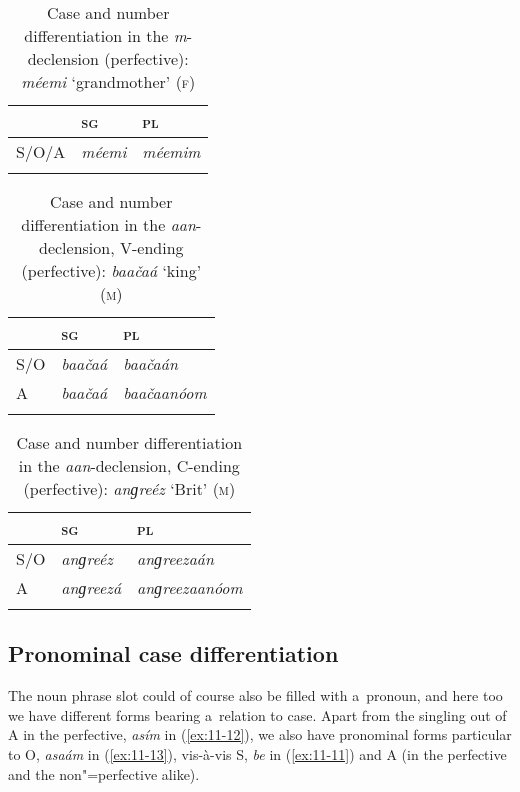 \begin{table}[ht]
\caption{Case and number differentiation in the \textit{m}-declension (perfective): \textit{méemi} `grandmother' \textsc{(f)}}
\begin{tabularx}{\textwidth}{ Q Q Q }
\lsptoprule
&
\textsc{sg} &
\textsc{pl}\\\hline
S/O/A &
\textit{méemi} &
\textit{méemim} \\\lspbottomrule
\end{tabularx}
\label{tab:11-mdecl}
\end{table}


\begin{table}[ht]
\caption{Case and number differentiation in the \textit{aan}-declension, V-ending (perfective): \textit{baačaá} `king' \textsc{(m)}}
\begin{tabularx}{\textwidth}{ Q Q Q }
\lsptoprule
&
\textsc{sg} &
\textsc{pl}\\\hline
S/O &
\textit{baačaá} &
\textit{baačaán} \\
A &
\textit{baačaá} &
\textit{baačaanóom} \\\lspbottomrule
\end{tabularx}
\label{tab:11-aanvdecl}
\end{table}

\begin{table}[ht]
\caption{Case and number differentiation in the \textit{aan}-declension, C-ending (perfective): \textit{anɡreéz} `Brit' \textsc{(m)}}
\begin{tabularx}{\textwidth}{ Q Q Q }
\lsptoprule
&
\textsc{sg} &
\textsc{pl}\\\hline
S/O &
\textit{anɡreéz} &
\textit{anɡreezaán} \\
A &
\textit{anɡreezá} &
\textit{anɡreezaanóom} \\\lspbottomrule
\end{tabularx}
\label{tab:11-aancdecl}
\end{table}




\subsection{Pronominal case differentiation}
\label{subsec:11-2-2}


The noun phrase slot could of course also be filled with a~pronoun, and here too we have different forms bearing a~relation to case. Apart from the singling out of A in the perfective, \textit{asím} in (\ref{ex:11-12}), we also have pronominal forms particular to O, \textit{asaám} in (\ref{ex:11-13}), vis-à-vis S, \textit{be} in (\ref{ex:11-11}) and A (in the perfective and the non"=perfective alike).

